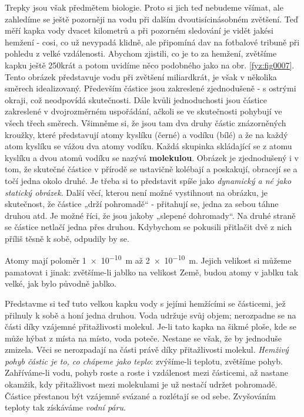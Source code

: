     Trepky jsou však předmětem biologie. Proto si jich teď nebudeme všímat, ale zahledíme se ještě
    pozorněji na vodu při dalším dvoutisícinásobném zvětšení. Teď měří kapka vody dvacet kilometrů a
    při pozorném sledování je vidět jakési hemžení - cosi, co už nevypadá klidně, ale připomíná dav
    na fotbalové tribuně při pohledu z velké vzdálenosti. Abychom zjistili, co je to za hemžení,
    zvětšíme kapku ještě 250krát a potom uvidíme něco podobného jako na obr. \ref{fyz:fig0007}. Tento
    obrázek představuje vodu při zvětšení miliardkrát, je však v několika směrech idealizovaný.
    Především částice jsou zakreslené zjednodušeně - s ostrými okraji, což neodpovídá skutečnosti.
    Dále kvůli jednoduchosti jsou částice zakreslené v dvojrozměrném uspořádání, ačkoli se ve
    skutečnosti pohybují ve všech třech směrech. Všimněme si, že jsou tam dva druhy částic
    znázorněných kroužky, které představují atomy kyslíku (černé) a vodíku (bílé) a že na každý atom
    kyslíku se vážou dva atomy vodíku. Každá skupinka skládající se z atomu kyslíku a dvou atomů
    vodíku se nazývá \textbf{molekulou}. Obrázek je zjednodušený i v tom, že skutečné částice v
    přírodě se ustavičně kolébají a poskakují, obracejí se a točí jedna okolo druhé. Je třeba si to
    představit spíše jako \emph{dynamický a né jako statický obrázek}. Další věcí, kterou není možné
    vystihnout na obrázku, je skutečnost, že částice „drží pohromadě“ - přitahují se, jedna za sebou
    táhne druhou atd. Je možné říci, že jsou jakoby „slepené dohromady“. Na druhé straně se částice
    netlačí jedna přes druhou. Kdybychom se pokusili přitlačit dvě z nich příliš těsně k sobě,
    odpudily by se.

    Atomy mají poloměr \qty{1e-10}{\m} až \qty{2e-10}{\m}. Jejich velikost si můžeme pamatovat i
    jinak: zvětšíme-li jablko na velikost Země, budou atomy v jablku tak velké, jak bylo původně
    jablko.

    Představme si teď tuto velkou kapku vody s jejími hemžícími se částicemi, jež přilnuly k sobě a
    honí jedna druhou. Voda udržuje svůj objem; nerozpadne se na části díky vzájemné přitažlivosti
    molekul. Je-li tato kapka na šikmé ploše, kde se může hýbat z místa na místo, voda poteče.
    Nestane se však, že by jednoduše zmizela. Věci se nerozpadají na části právě díky přitažlivosti
    molekul. \emph{Hemživý pohyb částic je to, co chápeme jako teplo}: zvýšíme-li teplotu, zvětšíme
    pohyb. Zahříváme-li vodu, pohyb roste a roste i vzdálenost mezi částicemi, až nastane okamžik,
    kdy přitažlivost mezi molekulami je už nestačí udržet pohromadě. Částice přestanou být vzájemně
    svázané a rozlétají se od sebe. Zvyšováním teploty tak získáváme \emph{vodní páru}.  
    
